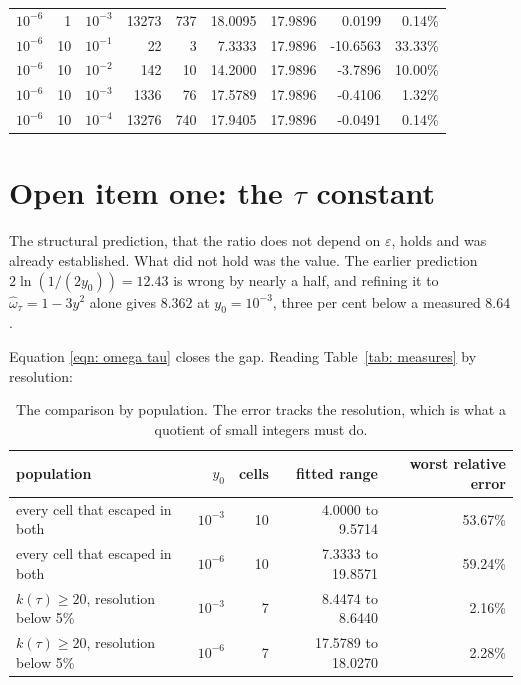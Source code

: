 \documentclass[11pt,a4paper]{article}
\theoremstyle{definition}
\theoremstyle{remark}
\begin{document}
\begin{table}[H]
\begin{tabular}{rrrrrrrrr}
    $10^{-6}$ & 1    & $10^{-3}$ & 13273 & 737 & 18.0095 & 17.9896 &   0.0199 & 0.14\% \\
    $10^{-6}$ & 10   & $10^{-1}$ &    22 &   3 &  7.3333 & 17.9896 & -10.6563 & 33.33\% \\
    $10^{-6}$ & 10   & $10^{-2}$ &   142 &  10 & 14.2000 & 17.9896 &  -3.7896 & 10.00\% \\
    $10^{-6}$ & 10   & $10^{-3}$ &  1336 &  76 & 17.5789 & 17.9896 &  -0.4106 & 1.32\% \\
    $10^{-6}$ & 10   & $10^{-4}$ & 13276 & 740 & 17.9405 & 17.9896 &  -0.0491 & 0.14\% \\
    \bottomrule
  \end{tabular}
\end{table}

\section{Open item one: the \texorpdfstring{$\tau$}{tau} constant}
\label{sec: open one}

The structural prediction, that the ratio does not depend on $\varepsilon$, holds
and was already established. What did not hold was the value. The earlier
prediction $2\ln(1/(2y_0)) = 12.43$ is wrong by nearly a half, and refining it to
$\hat\omega_\tau = 1-3y^2$ alone gives $8.362$ at $y_0 = 10^{-3}$, three per cent
below a measured $8.64$.

Equation \eqref{eqn: omega tau} closes the gap. Reading
Table~\ref{tab: measures} by resolution:

\begin{table}[H]
  \centering\small
  \caption{The comparison by population. The error tracks the resolution, which
    is what a quotient of small integers must do.}
  \label{tab: ratio summary}
  \begin{tabular}{lrrrr}
    \toprule
    population & $y_0$ & cells & fitted range & worst relative error \\
    \midrule
    every cell that escaped in both & $10^{-3}$ & 10 & 4.0000 to 9.5714 & 53.67\% \\
    every cell that escaped in both & $10^{-6}$ & 10 & 7.3333 to 19.8571 & 59.24\% \\
    \midrule
    $k(\tau) \geq 20$, resolution below 5\% & $10^{-3}$ & 7 & 8.4474 to 8.6440 & 2.16\% \\
    $k(\tau) \geq 20$, resolution below 5\% & $10^{-6}$ & 7 & 17.5789 to 18.0270 & 2.28\% \\
    \bottomrule
  \end{tabular}
\end{table}
\end{document}
